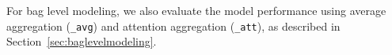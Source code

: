 
For bag level modeling, we also evaluate the model performance using average aggregation (\texttt{\_avg})
and attention aggregation (\texttt{\_att}), as described in Section~\ref{sec:baglevelmodeling}.



